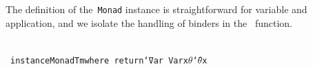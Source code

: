 \documentclass[9pt,authoryear]{sigplanconf}
\begin{document}
%
The definition of the{~}\texttt{Monad} instance is straightforward for
    variable and application, and we isolate the handling of binders in
    the{~}\texttt{\makebox[1.22ex][l]{$ {(} $}}\texttt{\makebox[1.22ex][c]{\textgreater{}}\makebox[1.22ex][c]{\textgreater{}}}\texttt{\makebox[1.22ex][r]{$ {)} $}} function.%


{\nopagebreak }

%
%
%
~\\~\vphantom{$\{$}\texttt{instance}\texttt{\mbox{\hspace{0.50em}}}\texttt{Monad}\texttt{\mbox{\hspace{0.50em}}}\texttt{Tm}\texttt{\mbox{\hspace{0.50em}}}\texttt{where}\texttt{{\nopagebreak \newline%
}\vphantom{$\{$}}\texttt{\mbox{\hspace{0.50em}}}\texttt{\mbox{\hspace{0.50em}}}\texttt{return}\texttt{\mbox{\hspace{0.50em}}}\texttt{{\char `\=}}\texttt{\mbox{\hspace{0.50em}}}\texttt{Var}\texttt{{\nopagebreak \newline%
}\vphantom{$\{$}}\texttt{\mbox{\hspace{0.50em}}}\texttt{\mbox{\hspace{0.50em}}}\texttt{Var}\texttt{\mbox{\hspace{0.50em}}}\texttt{x}\texttt{\mbox{\hspace{0.50em}}}\texttt{\mbox{\hspace{0.50em}}}\texttt{\mbox{\hspace{0.50em}}}\texttt{\makebox[1.22ex][c]{\textgreater{}}}\texttt{\mbox{\hspace{0.50em}}}\texttt{$ \theta $}\texttt{\mbox{\hspace{0.50em}}}\texttt{{\char `\=}}\texttt{\mbox{\hspace{0.50em}}}\texttt{$ \theta $}\texttt{\mbox{\hspace{0.50em}}}\texttt{x}\texttt{{\nopagebreak \newline%
}}
\end{document}

